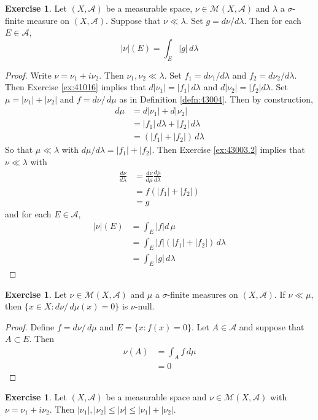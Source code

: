 \documentclass[12pt]{amsart}
\theoremstyle{definition}
\newtheorem{ex}[definition]{Exercise}
\newcommand{\lam}{\lambda}
\newcommand{\sig}{\sigma}
\newcommand{\MA}{\mathcal{A}}
\newcommand{\MM}{\mathcal{M}}
\newcommand{\dmu}{\, d \mu}
\newcommand{\dlam}{\, d \lambda}
\newcommand{\lex}[1]{\label{ex:#1}}
\newcommand{\rex}[1]{Exercise \ref{ex:#1}}
\newcommand{\rd}[1]{Definition \ref{defn:#1}}
\begin{document}
	\begin{ex} \lex{43004.5} 
	Let $(X,\MA)$ be a measurable space, $\nu \in \MM(X,\MA)$ and $\lam$ a $\sig$-finite measure on $(X, \MA)$. Suppose that $\nu \ll \lam$. Set $g = d\nu / d\lam$. Then for each $E \in \MA$, $$|\nu|(E) = \int_E |g| \dlam$$
	\end{ex}
	
	\begin{proof}
	Write $\nu = \nu_1 + i \nu_2$. Then $\nu_1, \nu_2 \ll \lam$. Set $f_1 = d\nu_1 / d\lam$ and $f_2 = d\nu_2 / d\lam$. Then \rex{41016} implies that $d|\nu_1| = |f_1| \dlam$ and $d|\nu_2| = |f_2|d\lam$. Set $\mu = |\nu_1| + |\nu_2|$ and $f = d\nu / \dmu$ as in \rd{43004}. Then by construction, 
	\begin{align*}
	d\mu
	&= d|\nu_1| + d|\nu_2| \\
	&= |f_1| \dlam + |f_2| \dlam \\
	&= (|f_1| + |f_2|) \dlam
	\end{align*}
	So that $\mu \ll \lam$ with $d\mu / d \lam = |f_1| + |f_2|$. Then \rex{43003.2} implies that $\nu \ll \lam$ with 
	\begin{align*}
	\frac{d\nu}{d\lam} 
	&= \frac{d\nu}{d\mu} \frac{d\mu}{d\lam}\\
	&= f(|f_1|+|f_2|) \\
	&= g
	\end{align*}
	and for each $E \in \MA$, 
	\begin{align*}
	|\nu|(E) 
	&= \int_E |f| d \, \mu \\
	&= \int_E |f| (|f_1| + |f_2|) \, d\lam \\
	&= \int_E|g| \, d\lam 
	\end{align*}
	\end{proof}
	
	\begin{ex} \lex{43005} 
		Let $\nu \in \MM(X, \MA)$ and $\mu$ a $\sig$-finite measures on $(X,\MA)$. If $\nu \ll \mu$, then $\{x \in X: d\nu / \dmu(x) = 0 \}$ is $\nu$-null.
	\end{ex}
	
	\begin{proof}
		Define $f = d\nu / \dmu$ and $E = \{x: f(x) = 0\}$. Let $A \in \MA$ and suppose that $A \subset E$. Then 
		\begin{align*}
			\nu(A) 
			&= \int_A f \dmu\\
			&= 0
		\end{align*} 
	\end{proof}
	
	\begin{ex} \lex{43006} 
		Let $(X, \MA)$ be a measurable space and $\nu \in \MM(X, \MA)$ with $\nu = \nu_1 + i\nu_2$. Then $|\nu_1|, |\nu_2| \leq |\nu| \leq |\nu_1| + |\nu_2|$.
		
	\end{ex}
	
\end{document}
